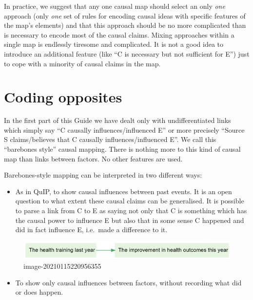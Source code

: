 \documentclass[
]{book}
\providecommand{\tightlist}{%
  \setlength{\itemsep}{0pt}\setlength{\parskip}{0pt}}
\begin{document}
In practice, we suggest that any one causal map should select an only \emph{one} approach (only \emph{one} set of rules for encoding causal ideas with specific features of the map's elements) and that this approach should be no more complicated than is necessary to encode most of the causal claims. Mixing approaches within a single map is endlessly tiresome and complicated. It is not a good idea to introduce an additional feature (like ``C is necessary but not sufficient for E'') just to cope with a minority of causal claims in the map.

\hypertarget{coding-opposites}{%
\chapter{Coding opposites}\label{coding-opposites}}

In the first part of this Guide we have dealt only with undifferentiated links which simply say ``C causally influences/influenced E'' or more precisely ``Source S claims/believes that C causally influences/influenced E''. We call this ``barebones style'' causal mapping. There is nothing more to this kind of causal map than links between factors. No other features are used.

Barebones-style mapping can be interpreted in two different ways:

\begin{itemize}
\tightlist
\item
  As in QuIP, to show causal influences between past events. It is an open question to what extent these causal claims can be generalised. It is possible to parse a link from C to E as saying not only that C is something which has the causal power to influence E but also that in some sense C happened and did in fact influence E, i.e.~made a difference to it.
\end{itemize}

\begin{figure}
\centering
\includegraphics{_assets/image-20210115220956355.png}
\caption{image-20210115220956355}
\end{figure}

\begin{itemize}
\tightlist
\item
  To show only causal influences between factors, without recording what did or does happen.
\end{itemize}
\end{document}
